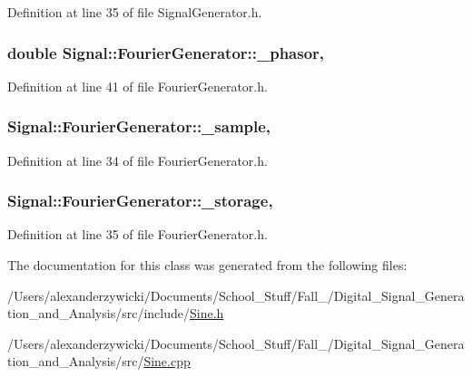 Definition at line 35 of file Signal\+Generator.\+h.

\hypertarget{classSignal_1_1FourierGenerator_a72d24f45a30cd143508ce7eb753f4436}{
\subsubsection[{\+\_\+phasor}]{\setlength{\rightskip}{0pt plus 5cm}double Signal\+::\+Fourier\+Generator\+::\+\_\+phasor\hspace{0.3cm}{\ttfamily [protected]}, {\ttfamily [inherited]}}}\label{classSignal_1_1FourierGenerator_a72d24f45a30cd143508ce7eb753f4436}


Definition at line 41 of file Fourier\+Generator.\+h.

\hypertarget{classSignal_1_1FourierGenerator_a78c37a66bf33a2fda3c9e92478ad418c}{
\subsubsection[{\+\_\+sample}]{ Signal\+::\+Fourier\+Generator\+::\+\_\+sample\hspace{0.3cm}{\ttfamily [protected]}, {\ttfamily [inherited]}}}\label{classSignal_1_1FourierGenerator_a78c37a66bf33a2fda3c9e92478ad418c}


Definition at line 34 of file Fourier\+Generator.\+h.

\hypertarget{classSignal_1_1FourierGenerator_af7ad42ccb202fba6c0fb1ec653c5cb36}{
\subsubsection[{\+\_\+storage}]{ Signal\+::\+Fourier\+Generator\+::\+\_\+storage\hspace{0.3cm}{\ttfamily [protected]}, {\ttfamily [inherited]}}}\label{classSignal_1_1FourierGenerator_af7ad42ccb202fba6c0fb1ec653c5cb36}


Definition at line 35 of file Fourier\+Generator.\+h.



The documentation for this class was generated from the following files\+:\begin{DoxyCompactItemize}
\item 
/\+Users/alexanderzywicki/\+Documents/\+School\+\_\+\+Stuff/\+Fall\+\_/\+Digital\+\_\+\+Signal\+\_\+\+Generation\+\_\+and\+\_\+\+Analysis/src/include/\hyperlink{Sine_8h}{Sine.\+h}\item 
/\+Users/alexanderzywicki/\+Documents/\+School\+\_\+\+Stuff/\+Fall\+\_/\+Digital\+\_\+\+Signal\+\_\+\+Generation\+\_\+and\+\_\+\+Analysis/src/\hyperlink{Sine_8cpp}{Sine.\+cpp}\end{DoxyCompactItemize}
